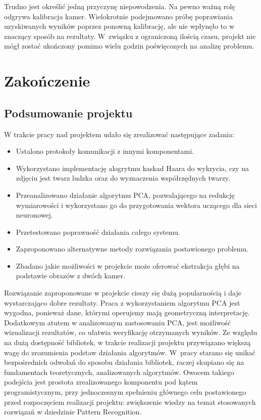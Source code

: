 \documentclass[oneside, eng]{mgr}
\begin{document}
Trudno jest określić jedną przyczynę niepowodzenia. Na pewno ważną rolę odgrywa kalibracja kamer. Wielokrotnie podejmowano próbę poprawiania uzyskiwanych wyników poprzez ponowną kalibrację, ale nie wpłynęło to w znaczący sposób na rezultaty. W~związku z ograniczoną ilością czasu, projekt nie mógł zostać ukończony pomimo wielu godzin poświęconych na analizę problemu.



\chapter{Zakończenie}

\section{Podsumowanie projektu}

W trakcie pracy nad projektem udało się zrealizować następujące zadania:
\begin{itemize}

\item Ustalono protokoły komunikacji z innymi komponentami.

\item Wykorzystano implementację alogrytmu kaskad Haara do wykrycia, czy na zdjęciu jest twarz ludzka oraz do wyznaczenia współrzędnych twarzy.

\item Przeanalizowano działanie algorytmu PCA, pozwalającego na redukcję wymiarowości i wykorzystano go do przygotowania wektora uczącego dla sieci neuronowej.

\item Przetestowano poprawność działania całego systemu.

\item Zaproponowano alternatywne metody rozwiązania postawionego problemu.

\item Zbadano jakie możliwości w projekcie może oferować ekstrakcja głębi na podstawie obrazów z dwóch kamer.

\end{itemize}

Rozwiązanie zaproponowane w projekcie cieszy się dużą popularnością i daje wystarczająco dobre rezultaty. Praca z wykorzystaniem algorytmu PCA jest wygodna, ponieważ dane, którymi operujemy mają geometryczną interpretację. Dodatkowym atutem w analizowanym zastosowaniu PCA, jest możliwość wizualizacji rezultatów, co ułatwia weryfikację otrzymanych wyników. Ze względu na dużą dostępność bibliotek, w trakcie realizacji projektu przywiązano większą wagę do zrozumienia podstaw działania algorytmów. W~pracy starano się unikać bezpośrednich odwołań do sposobu działania bibliotek, raczej skupiano się na fundamentach teoretycznych, analizowanych algorytmów. Owocem takiego podejścia jest prostota zrealizowanego komponentu pod kątem programistycznym, przy jednoczesnym spełnieniu głównego celu postawionego przed rozpoczęciem realizacji projektu: zwiększenie wiedzy na temat stosowanych rozwiązań w dziedzinie Pattern Recognition. 
\end{document}
